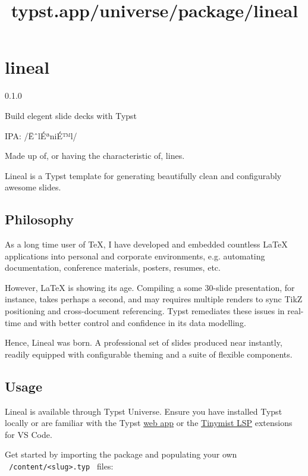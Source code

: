 \title{typst.app/universe/package/lineal}

\label{banner}
\section{lineal}\label{lineal}

{ 0.1.0 }

Build elegent slide decks with Typst

\label{readme}
IPA: /ËˆlÉªniÉ™l/

Made up of, or having the characteristic of, lines.

Lineal is a Typst template for generating beautifully clean and
configurably awesome slides.


\subsection{Philosophy}\label{philosophy}

As a long time user of TeX, I have developed and embedded countless
LaTeX applications into personal and corporate environments, e.g.
automating documentation, conference materials, posters, resumes, etc.

However, LaTeX is showing its age. Compiling a some 30-slide
presentation, for instance, takes perhaps a second, and may requires
multiple renders to sync TikZ positioning and cross-document
referencing. Typst remediates these issues in real-time and with better
control and confidence in its data modelling.

Hence, Lineal was born. A professional set of slides produced near
instantly, readily equipped with configurable theming and a suite of
flexible components.

\subsection{Usage}\label{usage}

Lineal is available through Typst Universe. Ensure you have installed
Typst locally or are familiar with the Typst
\href{https://typst.app/}{web app} or the
\href{https://marketplace.visualstudio.com/items?itemName=myriad-dreamin.tinymist}{Tinymist
LSP} extensions for VS Code.

Get started by importing the package and populating your own
\texttt{\ /content/\textless{}slug\textgreater{}.typ\ } files:

